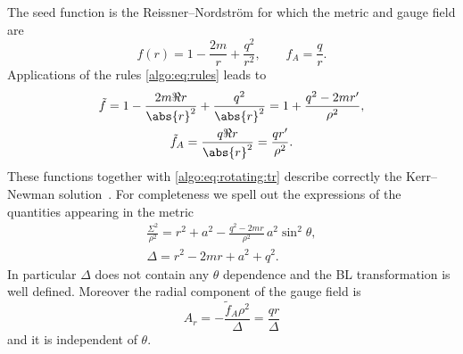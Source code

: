 The seed function is the Reissner--Nordström for which the metric and gauge field are
\begin{equation}
	\label{algo:eq:rn:functions}
	f(r) = 1 - \frac{2m}{r} + \frac{q^2}{r^2}, \qquad
	f_A = \frac{q}{r}.
\end{equation} 
Applications of the rules \eqref{algo:eq:rules} leads to
\begin{subequations}
\begin{gather}
	\tilde f = 1 - \frac{2 m \Re r}{\abs{r}^2} + \frac{q^2}{\abs{r}^2}
		= 1 + \frac{q^2 - 2 m r'}{\rho^2}, \\
	\tilde f_A = \frac{q \Re r}{\abs{r}^2}
		= \frac{q r'}{\rho^2}.
\end{gather}
\end{subequations}
These functions together with \eqref{algo:eq:rotating:tr} describe correctly the Kerr--Newman solution~\cite{Visser:2009:KerrSpacetimeBrief, Adamo:2014:KerrNewmanMetricReview}.
For completeness we spell out the expressions of the quantities appearing in the metric
\begin{subequations}
\begin{gather}
	\frac{\Sigma^2}{\rho^2} = r^2 + a^2 - \frac{q^2 - 2 m r}{\rho^2}\, a^2 \sin^2 \theta, \\
	\Delta = r^2 - 2 m r + a^2 + q^2.
\end{gather}
\end{subequations}
In particular $\Delta$ does not contain any $\theta$ dependence and the BL transformation is well defined.
Moreover the radial component of the gauge field is
\begin{equation}
	A_r = - \frac{\tilde f_A \rho^2}{\Delta}
		= \frac{q r}{\Delta}
\end{equation} 
and it is independent of $\theta$.
